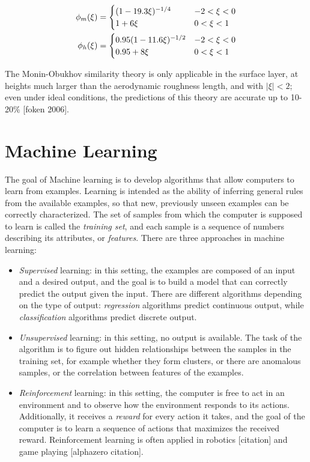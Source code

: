\documentclass[12pt]{book}
\begin{document}
\begin{align}
\phi_m(\xi)&=\begin{cases}
\mathrlap{(1-19.3\xi)^{-1/4}} \hphantom{0.95(1-11.6\xi)^{-1/2}} & -2<\xi<0 \\
1+6\xi & 0<\xi<1\\
\end{cases} \\
\phi_h(\xi)&=\begin{cases}
0.95(1-11.6\xi)^{-1/2} & -2<\xi<0 \\
0.95+8\xi & 0<\xi<1
\end{cases}
\end{align}

The Monin-Obukhov similarity theory is only applicable in the surface layer, at heights much larger than the aerodynamic roughness length, and with $\vert\xi\vert<2$; even under ideal conditions, the predictions of this theory are accurate up to 10-20\% [foken 2006].

\section{Machine Learning}
The goal of Machine learning is to develop algorithms that allow computers to learn from examples. Learning is intended as the ability of inferring general rules from the available examples, so that new, previously unseen examples can be correctly characterized. The set of samples from which the computer is supposed to learn is called the \emph{training set}, and each sample is a sequence of numbers describing its attributes, or \emph{features}. There are three approaches in machine learning:

\begin{itemize}
\item \emph{Supervised} learning: in this setting, the examples are composed of an input and a desired output, and the goal is to build a model that can correctly predict the output given the input. There are different algorithms depending on the type of output: \emph{regression} algorithms predict continuous output, while \emph{classification} algorithms predict discrete output.

\item \emph{Unsupervised} learning: in this setting, no output is available. The task of the algorithm is to figure out hidden relationships between the samples in the training set, for example whether they form clusters, or there are anomalous samples, or the correlation between features of the examples.

\item \emph{Reinforcement} learning: in this setting, the computer is free to act in an environment and to observe how the environment responds to its actions. Additionally, it receives a \emph{reward} for every action it takes, and the goal of the computer is to learn a sequence of actions that maximizes the received reward. Reinforcement learning is often applied in robotics [citation] and game playing [alphazero citation].
\end{itemize}
\end{document}
